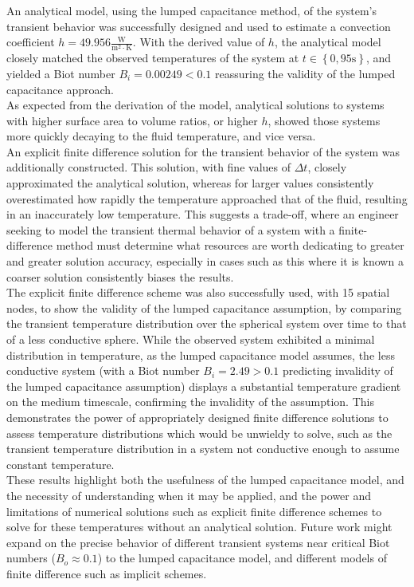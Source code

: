 \documentclass[12pt]{article}
\begin{document}
An analytical model, using the lumped capacitance method, of the system's transient behavior was successfully designed and used to estimate a convection coefficient $h=49.956\mathrm{\frac{W}{m^2\cdot K}}$.
With the derived value of $h$, the analytical model closely matched the observed temperatures of the system at $t\in\left\{0, 95\mathrm{s}\right\}$, and yielded a Biot number $B_i=0.00249<0.1$ reassuring the validity of the lumped capacitance approach.\\

As expected from the derivation of the model, analytical solutions to systems with higher surface area to volume ratios, or higher $h$, showed those systems more quickly decaying to the fluid temperature, and vice versa.\\

An explicit finite difference solution for the transient behavior of the system was additionally constructed.
This solution, with fine values of $\Delta t$, closely approximated the analytical solution, whereas for larger values consistently overestimated how rapidly the temperature approached that of the fluid, resulting in an inaccurately low temperature.
This suggests a trade-off, where an engineer seeking to model the transient thermal behavior of a system with a finite-difference method must determine what resources are worth dedicating to greater and greater solution accuracy, especially in cases such as this where it is known a coarser solution consistently biases the results.\\

The explicit finite difference scheme was also successfully used, with 15 spatial nodes, to show the validity of the lumped capacitance assumption, by comparing the transient temperature distribution over the spherical system over time to that of a less conductive sphere.
While the observed system exhibited a minimal distribution in temperature, as the lumped capacitance model assumes, the less conductive system (with a Biot number $B_i=2.49>0.1$ predicting invalidity of the lumped capacitance assumption) displays a substantial temperature gradient on the medium timescale, confirming the invalidity of the assumption.
This demonstrates the power of appropriately designed finite difference solutions to assess temperature distributions which would be unwieldy to solve, such as the transient temperature distribution in a system not conductive enough to assume constant temperature.\\

These results highlight both the usefulness of the lumped capacitance model, and the necessity of understanding when it may be applied, and the power and limitations of numerical solutions such as explicit finite difference schemes to solve for these temperatures without an analytical solution.
Future work might expand on the precise behavior of different transient systems near critical Biot numbers ($B_o\approx0.1$) to the lumped capacitance model, and different models of finite difference such as implicit schemes.
% 
\pagebreak
\printbibliography
\pagebreak
\appendix
\end{document}
